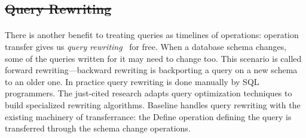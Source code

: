 \documentclass[english,submission]{programming}
\theoremstyle{definition}
\providecommand{\DIFadd}[1]{{\protect\color{blue}\uwave{#1}}} %
\providecommand{\DIFdel}[1]{{\protect\color{red}\sout{#1}}} %
\providecommand{\DIFaddbegin}{} %
\providecommand{\DIFaddend}{} %
\providecommand{\DIFdelbegin}{} %
\providecommand{\DIFdelend}{} %
\begin{document}





\DIFdelbegin \subsection{\DIFdel{Query Rewriting}}%
\addtocounter{subsection}{-1}%
\DIFdelend \DIFaddbegin \paragraph{\DIFadd{Query Rewriting}}
\DIFaddend 

There is another benefit to treating queries as timelines of operations: operation transfer gives us \textit{query rewriting}~\cite{curino08, herrmann17} for free. When a database schema changes, some of the queries written for it may need to change too. This scenario is called forward rewriting---backward rewriting is backporting a query on a new schema to an older one.
In practice query rewriting is done manually by SQL programmers. The just-cited research adapts query optimization techniques to build specialized rewriting algorithms.
Baseline handles query rewriting with the existing machinery of transferrance: the \textsf{Define} operation defining the query is transferred through the schema change operations.
\end{document}
